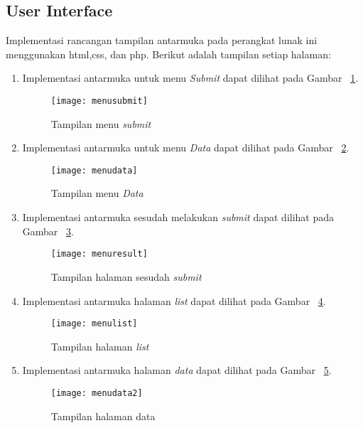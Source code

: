 \subsection{User Interface}

Implementasi rancangan tampilan antarmuka pada perangkat lunak ini menggunakan html,css, dan php. Berikut adalah tampilan setiap halaman:

\begin{enumerate}
\item Implementasi antarmuka untuk menu \textit{Submit} dapat dilihat pada Gambar ~\ref{fig:menusubmit}.

\begin{figure}[H]
    \centering  
    \texttt{[image: menusubmit]}  
    \caption[Tampilan menu \textit{Submit}]{Tampilan menu \textit{submit}} 
    \label{fig:menusubmit} 
\end{figure}

\item Implementasi antarmuka untuk menu \textit{Data} dapat dilihat pada Gambar ~\ref{fig:menudata}.

\begin{figure}[H]
    \centering  
    \texttt{[image: menudata]}  
    \caption[Tampilan menu \textit{Data}]{Tampilan menu \textit{Data}} 
    \label{fig:menudata} 
\end{figure}

\item Implementasi antarmuka sesudah melakukan \textit{submit} dapat dilihat pada Gambar ~\ref{fig:menuresult}.

\begin{figure}[H]
    \centering  
    \texttt{[image: menuresult]}  
    \caption[Tampilan halaman sesudah \textit{submit}]{Tampilan halaman sesudah \textit{submit}} 
    \label{fig:menuresult} 
\end{figure}

\item Implementasi antarmuka  halaman \textit{list} dapat dilihat pada Gambar ~\ref{fig:menulist}.

\begin{figure}[H]
    \centering  
    \texttt{[image: menulist]}  
    \caption[Tampilan halaman \textit{list}]{Tampilan halaman \textit{list}} 
    \label{fig:menulist} 
\end{figure}

\item Implementasi antarmuka  halaman \textit{data} dapat dilihat pada Gambar ~\ref{fig:menudata2}.

\begin{figure}[H]
    \centering  
    \texttt{[image: menudata2]}  
    \caption[Tampilan halaman data]{Tampilan halaman data} 
    \label{fig:menudata2} 
\end{figure}

\end{enumerate}

